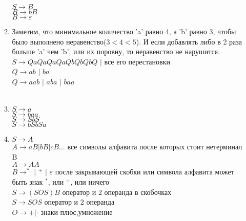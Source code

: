 \documentclass{article}
\begin{document}
\begin{enumerate}
\begin{enumerate}
					$S \rightarrow B$\\
					$B \rightarrow bB$\\
					$B \rightarrow \varepsilon$\\							

				\item 
					Заметим, что минимальное количество 'a' равно 4, а 'b' равно 3, чтобы было выполнено неравенство($3 < 4 < 5$). И если добавлять либо в 2 раза больше 'a' чем 'b', или их поровну, то неравенство не нарушится.\\
					$S \rightarrow QaQaQaQaQbQbQbQ$ | все его перестановки\\
					$Q \rightarrow ab$ $|$ $ba$\\
					$Q \rightarrow aab$ $|$ $aba$ $|$ $baa$\\\\									
				\item
					$S \rightarrow a$\\
					$S \rightarrow baa$\\
					$S \rightarrow SbS$\\
					$S \rightarrow bSbSa$\\
												
				\item
					$S \rightarrow A$\\ 
					$A \rightarrow aB|bB|cB\ldots$ все символы алфавита после которых стоит нетерминал B\\
					$A \rightarrow AA$\\
					$B \rightarrow ^*$ $|$ $^+ $ $|$ $ \varepsilon$ после закрывающей скобки или символа алфавита может быть знак $^*$, или $^+$, или ничего\\
					$S \rightarrow (SOS)B$ оператор и 2 операнда в скобочках\\
					$S \rightarrow SOS$ оператор и 2 операнда\\
					$O \rightarrow +|\cdot$  знаки плюс,умножение\\
					
										
					
			\end{enumerate}
			
	
	\end{enumerate}
 
\end{document}
